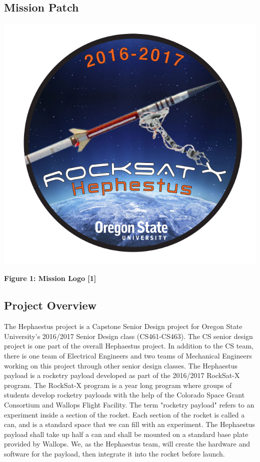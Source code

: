 \subsection{Mission Patch}
\includegraphics[width=\textwidth]{logo}
\begin{center}
\textbf{Figure 1: Mission Logo [1]}
\end{center}

\subsection{Project Overview}
The Hephaestus project is a Capstone Senior Design project for Oregon State University's 2016/2017 Senior Design class (CS461-CS463).
The CS senior design project is one part of the overall Hephaestus project.
In addition to the CS team, there is one team of Electrical Engineers and two teams of Mechanical Engineers working on this project through other senior design classes.
The Hephaestus \gls{payload} is a rocketry \gls{payload} developed as part of the 2016/2017 RockSat-X program.
The RockSat-X program is a year long program where groups of students develop rocketry payloads with the help of the Colorado Space Grant Consortium and Wallops Flight Facility.
The term "rocketry payload" refers to an experiment inside a section of the rocket.
Each section of the rocket is called a can, and is a standard space that we can fill with an experiment.
The Hephaestus payload shall take up half a can and shall be mounted on a standard base plate provided by Wallops.
We, as the Hephaestus team, will create the hardware and software for the payload, then integrate it into the rocket before launch.

